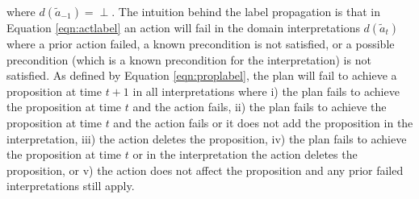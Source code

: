 \documentclass{article}
\begin{document}

\noindent where $d(\tilde{a}_{-1}) = \perp$. The intuition behind the label propagation is that in Equation \ref{eqn:actlabel} an action will fail  in the domain interpretations $d(\tilde{a}_t)$ where a prior action failed, a known precondition is not satisfied, or a possible precondition (which is a known precondition for the interpretation) is not satisfied. As defined by Equation \ref{eqn:proplabel}, the plan will fail to achieve a proposition at time $t+1$ in all interpretations where i) the plan fails to achieve the proposition at time $t$ and the action fails, ii) the plan fails to achieve the proposition at time $t$ and the action fails or it does not add the proposition in the interpretation, iii) the action deletes the proposition, iv) the plan fails to achieve the proposition at time $t$ or in the interpretation the action deletes the proposition, or v) the action does not affect the proposition and any prior failed interpretations still apply.
\end{document}
